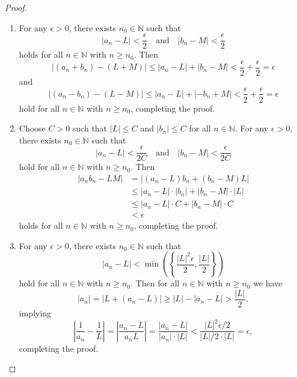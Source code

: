 \begin{proof}
  \leavevmode
  \begin{enumerate}
    \item For any $\epsilon > 0$, there exists $n_0 \in \mathbb{N}$ such that
    \begin{equation*}
      |a_n - L| < \frac{\epsilon}{2}
      \quad \text{and} \quad
      |b_n - M| < \frac{\epsilon}{2}
    \end{equation*}
    holds for all $n \in \mathbb{N}$ with $n \geq n_0$.
    Then
    \begin{equation*}
      \lvert (a_n + b_n) - (L + M) \rvert
      \leq \lvert a_n - L \rvert + \lvert b_n - M \rvert
      < \frac{\epsilon}{2} + \frac{\epsilon}{2}
      = \epsilon
    \end{equation*}
    and
    \begin{equation*}
      \lvert (a_n - b_n) - (L - M) \rvert
      \leq \lvert a_n - L \rvert + \lvert -b_n + M \rvert
      < \frac{\epsilon}{2} + \frac{\epsilon}{2}
      = \epsilon
    \end{equation*}
    hold for all $n \in \mathbb{N}$ with $n \geq n_0$, completing the proof.
    \item Choose $C > 0$ such that $|L| \leq C$ and $|b_n| \leq C$ for all
    $n \in \mathbb{N}$.
    For any $\epsilon > 0$, there exists $n_0 \in \mathbb{N}$ such that
    \begin{equation*}
      |a_n - L| < \frac{\epsilon}{2C}
      \quad \text{and} \quad
      |b_n - M| < \frac{\epsilon}{2C}
    \end{equation*}
    hold for all $n \in \mathbb{N}$ with $n \geq n_0$.
    Then
    \begin{align*}
      |a_nb_n - LM|
      &= |(a_n - L)b_n + (b_n - M)L| \\
      &\leq |a_n - L| \cdot |b_n| + |b_n - M| \cdot |L| \\
      &\leq |a_n - L| \cdot C + |b_n - M| \cdot C \\
      &< \epsilon
    \end{align*}
    holds for all $n \in \mathbb{N}$ with $n \geq n_0$, completing the proof.
    \item For any $\epsilon > 0$, there exists $n_0 \in \mathbb{N}$ such that
    \begin{equation*}
      |a_n - L|
      < \min\left(\left\{\frac{|L|^2\epsilon}{2}, \frac{|L|}{2}\right\}\right)
    \end{equation*}
    hold for all $n \in \mathbb{N}$ with $n \geq n_0$.
    Then for all $n \in \mathbb{N}$ with $n \geq n_0$ we have
    \begin{equation*}
      |a_n|
      = |L + (a_n - L)|
      \geq |L| - |a_n - L|
      > \frac{|L|}{2},
    \end{equation*}
    implying
    \begin{equation*}
      \left|\frac{1}{a_n} - \frac{1}{L}\right|
      = \left|\frac{a_n - L}{a_nL}\right|
      = \frac{|a_n - L|}{|a_n| \cdot |L|}
      < \frac{|L|^2\epsilon / 2}{|L| / 2 \cdot |L|}
      = \epsilon,
    \end{equation*}
    completing the proof.
    \qedhere
  \end{enumerate}
\end{proof}

